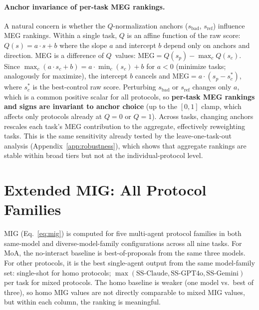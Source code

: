 \documentclass{article}
\newcommand{\meg}{\mathrm{MEG}}
\begin{document}
\paragraph{Anchor invariance of per-task MEG rankings.}
A natural concern is whether the $Q$-normalization anchors ($s_\mathrm{bad}$, $s_\mathrm{ref}$) influence MEG rankings. Within a single task, $Q$ is an affine function of the raw score: $Q(s) = a \cdot s + b$ where the slope $a$ and intercept $b$ depend only on anchors and direction. MEG is a difference of $Q$~values: $\meg = Q(s_p) - \max_c Q(s_c)$. Since $\max_c(a \cdot s_c + b) = a \cdot \min_c(s_c) + b$ for $a < 0$ (minimize tasks; analogously for maximize), the intercept $b$ cancels and $\meg = a \cdot (s_p - s^*_c)$, where $s^*_c$ is the best-control raw score. Perturbing $s_\mathrm{bad}$ or $s_\mathrm{ref}$ changes only $a$, which is a common positive scalar for all protocols, so \textbf{per-task MEG rankings and signs are invariant to anchor choice} (up to the $[0,1]$ clamp, which affects only protocols already at $Q{=}0$ or $Q{=}1$). Across tasks, changing anchors rescales each task's MEG contribution to the aggregate, effectively reweighting tasks. This is the same sensitivity already tested by the leave-one-task-out analysis (Appendix~\ref{app:robustness}), which shows that aggregate rankings are stable within broad tiers but not at the individual-protocol level.

\section{Extended MIG: All Protocol Families}
\label{app:mig}

MIG (Eq.~\ref{eq:mig}) is computed for five multi-agent protocol families in both same-model and diverse-model-family configurations across all nine tasks. For MoA, the no-interact baseline is best-of-proposals from the same three models. For other protocols, it is the best single-agent output from the same model-family set: single-shot for homo protocols; $\max(\text{SS-Claude}, \text{SS-GPT4o}, \text{SS-Gemini})$ per task for mixed protocols. The homo baseline is weaker (one model vs.\ best of three), so homo MIG values are not directly comparable to mixed MIG values, but within each column, the ranking is meaningful.
\end{document}
